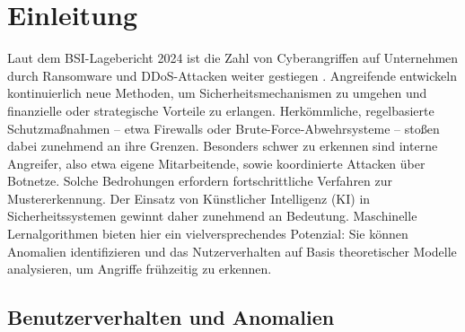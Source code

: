 \documentclass[a4paper,12pt]{article}
\begin{document}
	
	
	
	
	
	\printglossaries 
	\newpage

	\section{Einleitung}
	Laut dem BSI-Lagebericht 2024 ist die Zahl von Cyberangriffen auf Unternehmen durch Ransomware und DDoS-Attacken weiter gestiegen \cite{bsi2024lage}.
	Angreifende entwickeln kontinuierlich neue Methoden, um Sicherheitsmechanismen zu umgehen und finanzielle oder strategische Vorteile zu erlangen. Herkömmliche, regelbasierte Schutzmaßnahmen – etwa Firewalls oder Brute-Force-Abwehrsysteme – stoßen dabei zunehmend an ihre Grenzen.
	Besonders schwer zu erkennen sind interne Angreifer, also etwa eigene Mitarbeitende, sowie koordinierte Attacken über Botnetze. Solche Bedrohungen erfordern fortschrittliche Verfahren zur Mustererkennung. Der Einsatz von Künstlicher Intelligenz (KI) in Sicherheitssystemen gewinnt daher zunehmend an Bedeutung. Maschinelle Lernalgorithmen bieten hier ein vielversprechendes Potenzial: Sie können Anomalien identifizieren und das Nutzerverhalten auf Basis theoretischer Modelle analysieren, um Angriffe frühzeitig zu erkennen.
	
	\subsection{Benutzerverhalten und Anomalien}
	
\end{document}
